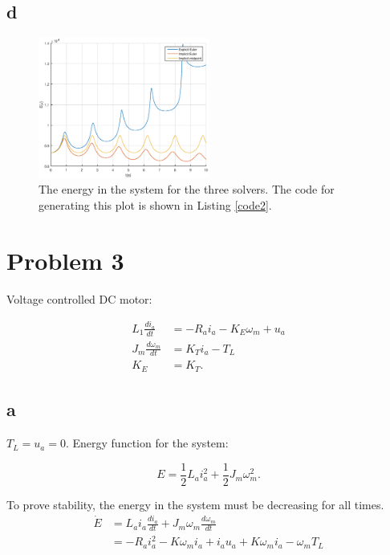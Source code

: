 \documentclass{article}
\begin{document}
\subsection{d}

\begin{figure}[!ht]\label{fig:spring2d}
	\centering
	\includegraphics[width = 0.5\textwidth]{ModSim_ex4_2d}
    \caption{The energy in the system for the three solvers. The code for generating this plot is shown in Listing \ref{code2}.}
\end{figure}

\section{Problem 3}

Voltage controlled DC motor:

\begin{align*}
	L_1\frac{di_a}{dt} &= - R_ai_a - K_E\omega_m + u_a\\
	J_m\frac{d\omega_m}{dt} &= K_Ti_a - T_L\\
	K_E &= K_T.
\end{align*}

\subsection{a}

$T_L = u_a = 0$. Energy function for the system:

\begin{equation*}
	E = \frac{1}{2}L_ai_a^2 + \frac{1}{2}J_m\omega_m^2.
\end{equation*}

To prove stability, the energy in the system must be decreasing for all times. 
\begin{align*}
	\dot E &= L_ai_a\frac{di_a}{dt} + J_m\omega_m\frac{d\omega_m}{dt}\\
	&= -R_ai_a^2 - K\omega_mi_a + i_au_a+K\omega_mi_a - \omega_mT_L
\end{align*}
\end{document}

